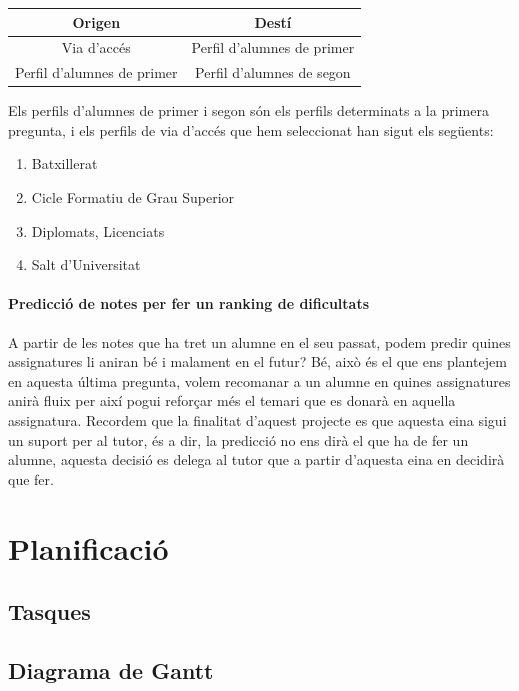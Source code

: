\documentclass[12pt,a4paper,catalan]{article}
\begin{document}
\begin{table}[h]
\centering
\begin{tabular}{@{}cc@{}}
\toprule
{\bf Origen}               & {\bf Destí}                \\ \midrule
Via d'accés                & Perfil d'alumnes de primer \\
Perfil d'alumnes de primer & Perfil d'alumnes de segon  \\ \bottomrule
\end{tabular}
\end{table}
Els perfils d'alumnes de primer i segon són els perfils determinats a la primera pregunta, i els perfils de via d'accés que hem seleccionat han sigut els següents:
\begin{enumerate}
	\item Batxillerat
	\item Cicle Formatiu de Grau Superior
	\item Diplomats, Licenciats
	\item Salt d'Universitat
\end{enumerate}

\paragraph{Predicció de notes per fer un ranking de dificultats}
A partir de les notes que ha tret un alumne en el seu passat, podem predir quines assignatures li aniran bé i malament en el futur? Bé, això és el que ens plantejem en aquesta última pregunta, volem recomanar a un alumne en quines assignatures anirà fluix per així pogui reforçar més el temari que es donarà en aquella assignatura. Recordem que la finalitat d'aquest projecte es que aquesta eina sigui un suport per al tutor, és a dir, la predicció no ens dirà el que ha de fer un alumne, aquesta decisió es delega al tutor que a partir d'aquesta eina en decidirà que fer.
\newpage

\section{Planificació}
\subsection{Tasques}
\subsection{Diagrama de Gantt}
\end{document}
